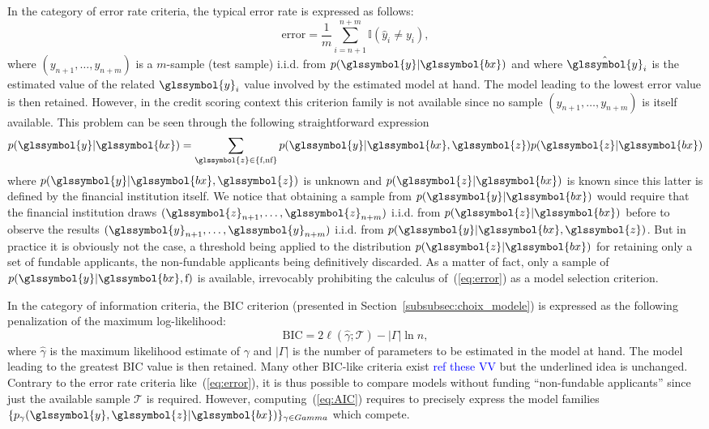In the category of error rate criteria, the typical error rate is expressed as follows:
\begin{equation}
\mbox{error} = \frac{1}{m} \sum_{i=n+1}^{n+m} \mathbb{I}(\hat y_i \neq y_i),
\end{equation} 
where $(y_{n+1},\ldots,y_{n+m})$ is a $m$-sample (test sample) i.i.d. from $p(\glssymbol{y}|\glssymbol{bx})$ and where $\hat{\glssymbol{y}}_i$ is the estimated value of the related $\glssymbol{y}_i$ value involved by the estimated model at hand. The model leading to the lowest error value is then retained. However, in the credit scoring context this criterion family is not available since no sample $(y_{n+1},\ldots,y_{n+m})$ is itself available. This problem can be seen through the following straightforward expression
\begin{equation}\label{eq:error}
p(\glssymbol{y}|\glssymbol{bx}) = \sum_{\glssymbol{z}\in\{\text{f},\text{nf}\}} p(\glssymbol{y}|\glssymbol{bx},\glssymbol{z}) p(\glssymbol{z}|\glssymbol{bx})
\end{equation}
where $p(\glssymbol{y}|\glssymbol{bx},\glssymbol{z})$ is unknown and $p(\glssymbol{z}|\glssymbol{bx})$ is known since this latter is defined by the financial institution itself. We notice that obtaining a sample from $p(\glssymbol{y}|\glssymbol{bx})$ would require that the financial institution draws $(\glssymbol{z}_{n+1},\ldots,\glssymbol{z}_{n+m})$ i.i.d. from $p(\glssymbol{z}|\glssymbol{bx})$ before to observe the results $(\glssymbol{y}_{n+1},\ldots,\glssymbol{y}_{n+m})$ i.i.d. from $p(\glssymbol{y}|\glssymbol{bx},\glssymbol{z})$. But in practice it is obviously not the case, a threshold being applied to the distribution $p(\glssymbol{z}|\glssymbol{bx})$ for retaining only a set of fundable applicants, the non-fundable applicants being definitively discarded. As a matter of fact, only a sample of $p(\glssymbol{y}|\glssymbol{bx},\text{f})$ is available, 
irrevocably prohibiting the calculus of~(\ref{eq:error}) as a model selection criterion.

In the category of information criteria, the BIC criterion (presented in Section~\ref{subsubsec:choix_modele}) is expressed as the following penalization of the maximum log-likelihood:
\begin{equation}\label{eq:AIC}
\mbox{BIC} = 2 \ell(\hat\gamma;\mathcal{T}) - |\Gamma| \ln n,
\end{equation}
where $\hat\gamma$ is the maximum likelihood estimate of $\gamma$ and $|\Gamma|$ is the number of parameters to be estimated in the model at hand. The model leading to the greatest BIC value is then retained. Many other BIC-like criteria exist \textcolor{blue}{ref these VV} but the underlined idea is unchanged. Contrary to the error rate criteria like~(\ref{eq:error}), it is thus possible to compare models without funding ``non-fundable applicants'' since just the available sample $\mathcal{T}$ is required. However, computing~(\ref{eq:AIC}) requires to precisely express the model families $\{p_{\gamma}(\glssymbol{y},\glssymbol{z}|\glssymbol{bx})\}_{\gamma \in Gamma}$ which compete.

